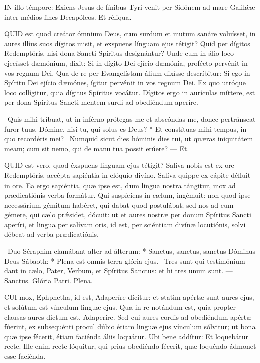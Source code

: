 
\lettrine[lines=2]{I}{N} illo témpore: Exiens Jesus de fínibus Tyri venit per Sidónem ad mare Galilǽæ inter médios fines Decapóleos. Et réliqua.



\lettrine[lines=2]{Q}{UID} est quod creátor ómnium Deus, cum surdum et mutum sanáre voluísset, in aures illíus suos dígitos misit, et exspuens línguam ejus tétigit? Quid per dígitos Redemptóris, nisi dona Sancti Spíritus designántur? Unde cum in álio loco ejecísset dæmónium, dixit: Si in dígito Dei ejício dæmónia, profécto pervénit in vos regnum Dei. Qua de re per Evangelístam álium dixísse descríbitur: Si ego in Spíritu Dei ejício dæmónes, ígitur pervénit in vos regnum Dei. Ex quo utróque loco collígitur, quia dígitus Spíritus vocátur. Dígitos ergo in aurículas míttere, est per dona Spíritus Sancti mentem surdi ad obediéndum aperíre.

\R\ Quis mihi tríbuat, ut in inférno prótegas me et abscóndas me, donec pertránseat furor tuus, Dómine, nisi tu, qui solus es Deus? * Et constítuas mihi tempus, in quo recordéris mei? \V\ Numquid sicut dies hóminis dies tui, ut quæras iniquitátem meam; cum sit nemo, qui de manu tua possit erúere? — Et.


\lettrine[lines=2]{Q}{UID} est vero, quod éxspuens linguam ejus tétigit? Salíva nobis est ex ore Redemptóris, accépta sapiéntia in elóquio divíno. Salíva quippe ex cápite défluit in ore. Ea ergo sapiéntia, quæ ipse est, dum lingua nostra tángitur, mox ad prædicatiónis verba formátur. Qui suspíciens in cælum, ingémuit: non quod ipse necessárium gémitum habéret, qui dabat quod postulábat; sed nos ad eum gémere, qui cælo prǽsidet, dócuit: ut et aures nostræ per donum Spíritus Sancti aperíri, et lingua per salívam oris, id est, per sciéntiam divínæ locutiónis, solvi débeat ad verba prædicatiónis.

\R\ Duo Séraphim clamábant alter ad álterum: * Sanctus, sanctus, sanctus Dóminus Deus Sábaoth: * Plena est omnis terra glória ejus. \V\ Tres sunt qui testimónium dant in cælo, Pater, Verbum, et Spíritus Sanctus: et hi tres unum sunt. — Sanctus. Glória Patri. Plena.


\lettrine[lines=2]{C}{UI} mox, Ephphetha, id est, Adaperíre dícitur: et statim apértæ sunt aures ejus, et solútum est vínculum linguæ ejus. Qua in re notándum est, quia propter clausas aures dictum est, Adaperíre. Sed cui aures cordis ad obediéndum apértæ fúerint, ex subsequénti procul dúbio étiam linguæ ejus vínculum sólvitur; ut bona quæ ipse fécerit, étiam faciénda áliis loquátur. Ubi bene addítur: Et loquebátur recte. Ille enim recte lóquitur, qui prius obediéndo fécerit, quæ loquéndo ádmonet esse faciénda.


